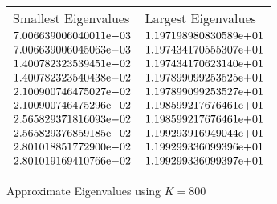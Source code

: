 \begin{enumerate}
\begin{figure}[tbh]
 \centering    
\begin{tabular}{ ||p{6cm}||p{6cm}|}
\hline
 Smallest Eigenvalues & Largest Eigenvalues \\ \hhline{|=|=|}    
\hline
${7.006639006040011}\mathrm{e}{-03}$ & ${1.197198980830589}\mathrm{e}{+01}$ \\  
${7.006639006045063}\mathrm{e}{-03}$ & ${1.197434170555307}\mathrm{e}{+01}$ \\  
${1.400782323539451}\mathrm{e}{-02}$ & ${1.197434170623140}\mathrm{e}{+01}$ \\  
${1.400782323540438}\mathrm{e}{-02}$ & ${1.197899099253525}\mathrm{e}{+01}$ \\  
${2.100900746475027}\mathrm{e}{-02}$ & ${1.197899099253527}\mathrm{e}{+01}$ \\  
${2.100900746475296}\mathrm{e}{-02}$ & ${1.198599217676461}\mathrm{e}{+01}$ \\  
${2.565829371816093}\mathrm{e}{-02}$ & ${1.198599217676461}\mathrm{e}{+01}$ \\  
${2.565829376859185}\mathrm{e}{-02}$ & ${1.199293916949044}\mathrm{e}{+01}$ \\  
${2.801018851772900}\mathrm{e}{-02}$ & ${1.199299336099396}\mathrm{e}{+01}$ \\  
${2.801019169410766}\mathrm{e}{-02}$ & ${1.199299336099397}\mathrm{e}{+01}$ \\  
\hline  
\end{tabular} 
\caption{Approximate Eigenvalues using $K = 800$}
   \label{tab:app_eig_800}
\end{figure} 


\end{enumerate}
